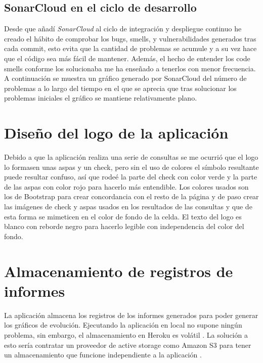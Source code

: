 \subsection{SonarCloud en el ciclo de desarrollo}
Desde que añadí \textit{SonarCloud} al ciclo de integración y despliegue continuo he creado el hábito de comprobar los bugs, smells, y vulnerabilidades generados tras cada commit, esto evita que la cantidad de problemas se acumule y a su vez hace que el código sea más fácil de mantener. Además, el hecho de entender los code smells conforme los solucionaba me ha enseñado a tenerlos con menor frecuencia. A continuación se muestra un gráfico generado por SonarCloud del número de problemas a lo largo del tiempo en el que se aprecia que tras solucionar los problemas iniciales el gráfico se mantiene relativamente plano. 

\section{Diseño del logo de la aplicación}
Debido a que la aplicación realiza una serie de consultas se me ocurrió que el logo lo formasen unas aspas y un check, pero sin el uso de colores el símbolo resultante puede resultar confuso, así que rodeé la parte del check con color verde y la parte de las aspas con color rojo para hacerlo más entendible.
Los colores usados son los de Bootstrap para crear concordancia con el resto de la página y de paso crear las imágenes de check y aspas usados en los resultados de las consultas y que de esta forma se mimeticen en el color de fondo de la celda. El texto del logo es blanco con reborde negro para hacerlo legible con independencia del color del fondo. 

\section{Almacenamiento de registros de informes}
La aplicación almacena los registros de los informes generados para poder generar los gráficos de evolución. Ejecutando la aplicación en local no supone ningún problema, sin embargo, el almacenamiento en Heroku es volátil \cite{ephemeralHeroku-2018}. La solución a esto sería contratar un proveedor de active storage como Amazon S3 para tener un almacenamiento que funcione independiente a la aplicación \cite{activeStorageOverview-2019}.

